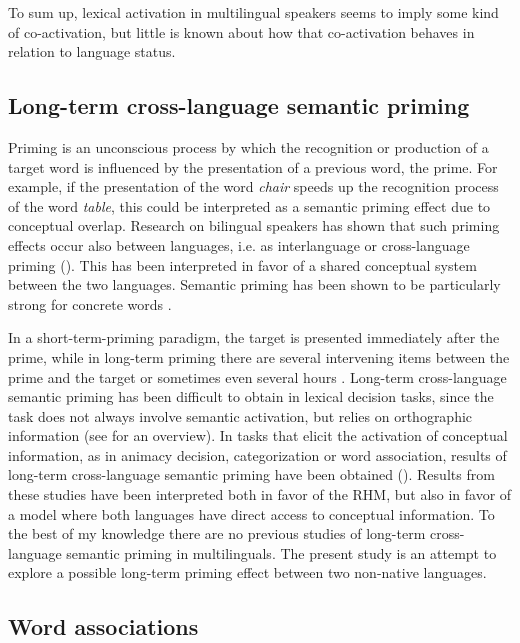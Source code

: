 \documentclass[output=paper,colorlinks,citecolor=brown,nonflat]{langsci/langscibook}
\begin{document}
To sum up, lexical activation in multilingual speakers seems to imply some kind of co-activation, but little is known about how that co-activation behaves in relation to language status.

\subsection{Long-term cross-language semantic priming}\label{sec:gudmundson:1.3}

Priming is an unconscious process by which the recognition or production of a target word is influenced by the presentation of a previous word, the prime. For example, if the presentation of the word \textit{chair} speeds up the recognition process of the word \textit{table}, this could be interpreted as a semantic priming effect due to conceptual overlap. Research on bilingual speakers has shown that such priming effects occur also between languages, i.e. as interlanguage or cross-language priming (\citealt{ChenHo1986, DeGrootNas1991, DuyckEtAl2008, SchoonbaertEtAl2009}). This has been interpreted in favor of a shared conceptual system between the two languages. Semantic priming has been shown to be particularly strong for concrete words \citep{Jin1990}.

In a short-term-priming paradigm, the target is presented immediately after the prime, while in long-term priming there are several intervening items between the prime and the target or sometimes even several hours \citep{WagenmakersEtAl2003}. Long-term cross-language semantic priming has been difficult to obtain in lexical decision tasks, since the task does not always involve semantic activation, but relies on orthographic information (see \citealt{GollanKroll2003} for an overview). In tasks that elicit the activation of conceptual information, as in animacy decision, categorization or word association, results of long-term cross-language semantic priming have been obtained (\citealt{ZeelenbergPecher2003, LiEtAl2009, FitzpatrickIzura2011}). Results from these studies have been interpreted both in favor of the RHM, but also in favor of a model where both languages have direct access to conceptual information. To the best of my knowledge there are no previous studies of long-term cross-language semantic priming in multilinguals. The present study is an attempt to explore a possible long-term priming effect between two non-native languages.

\subsection{Word associations}\label{sec:gudmundson:1.4}
\end{document}
